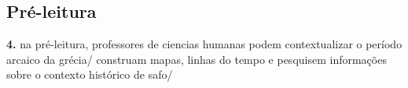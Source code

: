 \documentclass[12pt]{extarticle}
\begin{document}





\subsection{Pré-leitura}


\textbf{4.} na pré-leitura, professores de ciencias humanas podem
contextualizar o período arcaico da grécia/ construam mapas, linhas do
tempo e pesquisem informações sobre o contexto histórico de safo/

\end{document}
